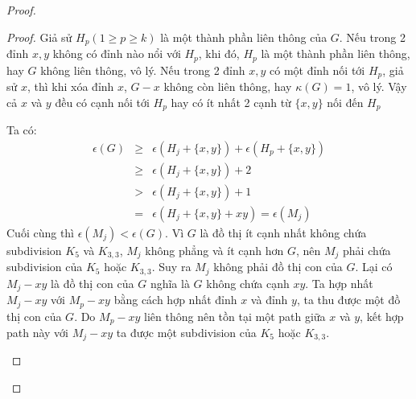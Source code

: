 \begin{proof}
\begin{enumerate}
\begin{proof}
                  Giả sử $H_p (1 \geq p \geq k)$ là một thành phần liên thông của $G$.
                  Nếu trong 2 đỉnh $x,y$ không có đỉnh nào nổi với $H_p$, khi đó, $H_p$ là một thành phần liên thông, hay $G$ không liên thông, vô lý.
                  Nếu trong 2 đỉnh $x,y$ có một đỉnh nối tới $H_p$, giả sử $x$, thì khi xóa đỉnh $x$, $G-x$ không còn liên thông, hay $\kappa(G)=1$, vô lý.
                  Vậy cả $x$ và $y$ đều có cạnh nối tới $H_p$ hay có ít nhất 2 cạnh từ $\{x,y\}$ nối đến $H_p$

                  Ta có:
                  \begin{eqnarray*}
                      \epsilon(G)& \geq &\epsilon(H_j+\{x,y\}) + \epsilon(H_p +\{x,y\}) \\
                      & \geq & \epsilon(H_j+\{x,y\}) + 2\\
                      & > & \epsilon(H_j+\{x,y\}) + 1 \\
                      & = & \epsilon(H_j+\{x,y\} + xy) = \epsilon(M_j)
                  \end{eqnarray*}
                  Cuối cùng thì $\epsilon(M_j) < \epsilon(G)$. Vì $G$ là đồ thị ít cạnh nhất không chứa subdivision $K_5$ và $K_{3,3}$, $M_j$ không phẳng và ít cạnh hơn $G$, nên $M_j$ phải chứa subdivision của $K_5$ hoặc $K_{3,3}$.
                  Suy ra $M_j$ không phải đồ thị con của $G$.
                  Lại có $M_j -xy$ là đồ thị con của $G$ nghĩa là $G$ không chứa cạnh $xy$.
                  Ta hợp nhất $M_j-xy$ với $M_p-xy$ bằng cách hợp nhất đỉnh $x$ và đỉnh $y$, ta thu được một đồ thị con của $G$.
                  Do $M_p -xy$ liên thông nên tồn tại một path giữa $x$ và $y$, kết hợp path này với $M_j-xy$ ta được một subdivision của  $K_5$ hoặc $K_{3,3}$.
                  \begin{figure}[H]
                      \centering
\end{figure}
\end{proof}
\end{enumerate}
\end{proof}
